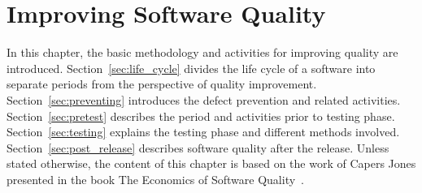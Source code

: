 
 \chapter{Improving Software Quality}

In this chapter, the basic methodology and activities for improving quality are introduced. Section~\ref{sec:life_cycle} divides the life cycle of a software into separate periods from the perspective of quality improvement. Section~\ref{sec:preventing} introduces the defect prevention and related activities. Section~\ref{sec:pretest} describes the period and activities prior to testing phase. Section~\ref{sec:testing} explains the testing phase and different methods involved. Section~\ref{sec:post_release} describes software quality after the release. Unless stated otherwise, the content of this chapter is based on the work of Capers Jones presented in the book The Economics of Software Quality~\cite{jones2011economics}.







 

 

 

